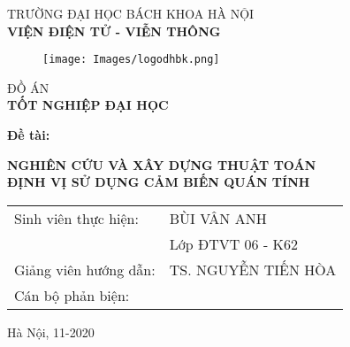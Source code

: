 \cleardoublepage
\thispagestyle{empty}
\begin{center}
\vspace{-12pt}  TRƯỜNG ĐẠI HỌC BÁCH KHOA HÀ NỘI \\
\textbf{\fontsize{16pt}{0pt}\selectfont VIỆN ĐIỆN TỬ - VIỄN THÔNG}
\vspace{0.5cm}
 \begin{figure}[H]
     \centering
     \texttt{[image: Images/logodhbk.png]}
 \end{figure}
\vspace{1.5cm}
\fontsize{24pt}{0pt}\selectfont ĐỒ ÁN\\
\vspace{12pt}
\textbf{\fontsize{32pt}{0pt}\selectfont TỐT NGHIỆP ĐẠI HỌC}
\vspace{1.5cm}
\end{center}
\hspace{6pt}\textbf{\fontsize{14pt}{0pt}\selectfont Đề tài:}
\begin{center}
    \textbf{\fontsize{20pt}{0pt}\selectfont NGHIÊN CỨU VÀ XÂY DỰNG THUẬT TOÁN}\\
    \textbf{\fontsize{20pt}{0pt}\selectfont ĐỊNH VỊ SỬ DỤNG CẢM BIẾN QUÁN TÍNH}

\vspace{1.5cm}
\begin{table}[H]
    \centering
    \begin{tabular}{l l}
 \fontsize{14pt}{0pt}\selectfont Sinh viên thực hiện:    & \fontsize{14pt}{0pt}\selectfont BÙI VÂN ANH \vspace{6pt} \\ 
     & \fontsize{14pt}{0pt}\selectfont Lớp ĐTVT 06 - K62 \vspace{6pt}\\
\fontsize{14pt}{0pt}\selectfont Giảng viên hướng dẫn: & \fontsize{14pt}{0pt}\selectfont TS. NGUYỄN TIẾN HÒA \vspace{6pt}\\
\fontsize{14pt}{0pt}\selectfont Cán bộ phản biện: & 
\end{tabular}
\end{table}
\vspace{2.5cm}
 \fontsize{14pt}{0pt}\selectfont Hà Nội, 11-2020
\end{center}
\cleardoublepage
